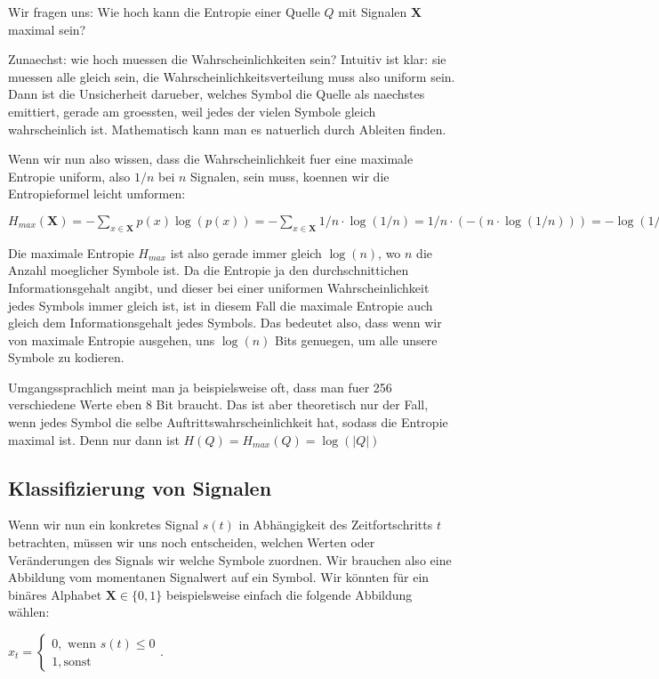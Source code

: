 Wir fragen uns: Wie hoch kann die Entropie einer Quelle $Q$ mit Signalen
$\mathbf{X}$ maximal sein?

Zunaechst: wie hoch muessen die Wahrscheinlichkeiten sein? Intuitiv ist klar:
sie muessen alle gleich sein, die Wahrscheinlichkeitsverteilung muss also
uniform sein. Dann ist die Unsicherheit darueber, welches Symbol die Quelle als
naechstes emittiert, gerade am groessten, weil jedes der vielen Symbole gleich
wahrscheinlich ist. Mathematisch kann man es natuerlich durch Ableiten finden.

Wenn wir nun also wissen, dass die Wahrscheinlichkeit fuer eine maximale
Entropie uniform, also $1/n$ bei $n$ Signalen, sein muss, koennen wir die
Entropieformel leicht umformen:

$H_{max}(\mathbf{X}) = -\sum_{x \in \mathbf{X}} p(x)\log(p(x)) = -\sum_{x \in
\mathbf{X}} 1/n \cdot \log(1/n) = 1/n \cdot (-(n \cdot \log(1/n))) = -\log(1/n) =
\log(n)$

Die maximale Entropie $H_{max}$ ist also gerade immer gleich $\log(n)$, wo $n$
die Anzahl moeglicher Symbole ist. Da die Entropie ja den durchschnittichen
Informationsgehalt angibt, und dieser bei einer uniformen Wahrscheinlichkeit
jedes Symbols immer gleich ist, ist in diesem Fall die maximale Entropie auch
gleich dem Informationsgehalt jedes Symbols. Das bedeutet also, dass wenn wir
von maximale Entropie ausgehen, uns $\log(n)$ Bits genuegen, um alle unsere
Symbole zu kodieren.

Umgangssprachlich meint man ja beispielsweise oft, dass man fuer 256
verschiedene Werte eben 8 Bit braucht. Das ist aber theoretisch nur der Fall,
wenn jedes Symbol die selbe Auftrittswahrscheinlichkeit hat, sodass die Entropie
maximal ist. Denn nur dann ist $H(Q) = H_{max}(Q) = \log(|Q|)$

\subsection{ Klassifizierung von Signalen}

Wenn wir nun ein konkretes Signal $s(t)$ in Abhängigkeit des Zeitfortschritts
$t$ betrachten, müssen wir uns noch entscheiden, welchen Werten oder
Veränderungen des Signals wir welche Symbole zuordnen. Wir brauchen also eine
Abbildung vom momentanen Signalwert auf ein Symbol. Wir könnten für ein binäres
Alphabet $\mathbf{X} \in \{0, 1\}$ beispielsweise einfach die folgende Abbildung
wählen:

$x_t = \begin{cases}0, \text{ wenn } s(t) \leq 0\\1, \text{
sonst}\end{cases}.$


